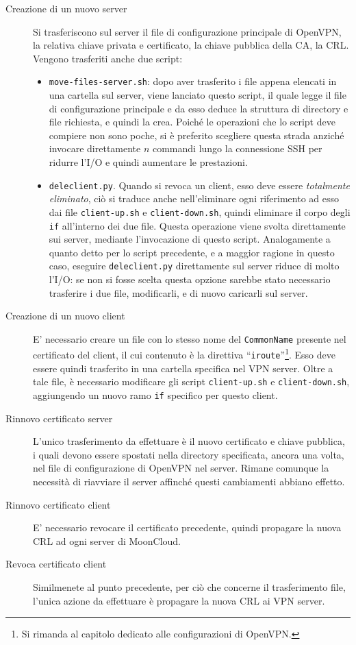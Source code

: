 \begin{description}
	\item[Creazione di un nuovo server]Si trasferiscono sul server il file
	di configurazione principale di OpenVPN, la relativa chiave privata e certificato,
	la chiave pubblica della CA, la CRL.
	Vengono trasferiti anche due script:
	\begin{itemize}
		\item \texttt{move-files-server.sh}: dopo aver trasferito i file appena elencati
		      in una cartella sul server, viene lanciato questo script, il quale legge il file
		      di configurazione principale e da esso deduce la struttura di directory e file
		      richiesta, e quindi la crea.
		      Poiché le operazioni che lo script deve compiere non sono poche, si è
		      preferito scegliere questa strada anziché invocare direttamente $n$ commandi 
		      lungo la connessione SSH per ridurre l'I/O e quindi aumentare le prestazioni.
		\item \texttt{deleclient.py}. Quando si revoca un client, esso deve essere
		      \textit{totalmente eliminato}, ciò si traduce anche nell'eliminare ogni riferimento
		      ad esso dai file \texttt{client-up.sh} e \texttt{client-down.sh}, quindi eliminare
		      il corpo degli \texttt{if} all'interno dei due file. Questa operazione viene
		      svolta direttamente sui server, mediante l'invocazione di questo script.
		      Analogamente a quanto detto per lo script precedente, e a maggior ragione in questo
		      caso, eseguire \texttt{deleclient.py} direttamente sul server riduce di molto l'I/O:
		      se non si fosse scelta questa opzione sarebbe stato necessario trasferire i due file,
		      modificarli, e di nuovo caricarli sul server.
	\end{itemize}
	\item[Creazione di un nuovo client]E' necessario creare un file con lo stesso
	nome del \texttt{CommonName} presente nel certificato del client, il cui
	contenuto è la direttiva ``\texttt{iroute}''\footnote{Si rimanda al capitolo dedicato
	alle configurazioni di OpenVPN.}. Esso deve essere quindi trasferito in una cartella
	specifica nel VPN server. Oltre a tale file, è necessario modificare gli script
	\texttt{client-up.sh} e \texttt{client-down.sh}, aggiungendo un nuovo ramo
	\texttt{if} specifico per questo client.
	\item[Rinnovo certificato server]L'unico trasferimento da effettuare è il nuovo
	certificato e chiave pubblica, i quali devono essere spostati nella directory
	specificata, ancora una volta, nel file di configurazione di OpenVPN nel server.
	Rimane comunque la necessità di riavviare il server affinché questi cambiamenti abbiano
	effetto.
	\item[Rinnovo certificato client]E' necessario revocare il certificato precedente,
	quindi propagare la nuova CRL ad ogni server di MoonCloud.
	\item[Revoca certificato client]Similmenete al punto precedente, per ciò che concerne
	il trasferimento file, l'unica azione da effettuare è propagare la nuova
	CRL ai VPN server.
\end{description}

